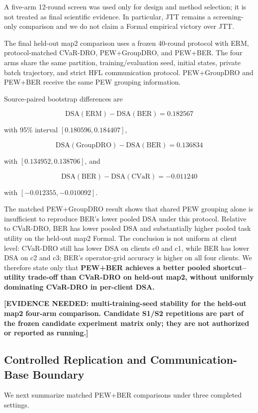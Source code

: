 A five-arm 12-round screen was used only for design and method selection; it is not treated as final scientific evidence. In particular, JTT remains a screening-only comparison and we do not claim a Formal empirical victory over JTT.

The final held-out map2 comparison uses a frozen 40-round protocol with ERM, protocol-matched CVaR-DRO, PEW+GroupDRO, and PEW+BER. The four arms share the same partition, training/evaluation seed, initial states, private batch trajectory, and strict HFL communication protocol. PEW+GroupDRO and PEW+BER receive the same PEW grouping information.



Source-paired bootstrap differences are

\[
\mathrm{DSA(ERM)}-\mathrm{DSA(BER)}=0.182567
\]

with 95\% interval \([0.180596,0.184407]\),

\[
\mathrm{DSA(GroupDRO)}-\mathrm{DSA(BER)}=0.136834
\]

with \([0.134952,0.138706]\), and

\[
\mathrm{DSA(BER)}-\mathrm{DSA(CVaR)}=-0.011240
\]

with \([-0.012355,-0.010092]\).

The matched PEW+GroupDRO result shows that shared PEW grouping alone is insufficient to reproduce BER's lower pooled DSA under this protocol. Relative to CVaR-DRO, BER has lower pooled DSA and substantially higher pooled task utility on the held-out map2 Formal. The conclusion is not uniform at client level: CVaR-DRO still has lower DSA on clients c0 and c1, while BER has lower DSA on c2 and c3; BER's operator-grid accuracy is higher on all four clients. We therefore state only that \textbf{PEW+BER achieves a better pooled shortcut--utility trade-off than CVaR-DRO on held-out map2, without uniformly dominating CVaR-DRO in per-client DSA.}

\textbf{[EVIDENCE NEEDED: multi-training-seed stability for the held-out map2 four-arm comparison. Candidate S1/S2 repetitions are part of the frozen candidate experiment matrix only; they are not authorized or reported as running.]}

\subsection{Controlled Replication and Communication-Base Boundary}

We next summarize matched PEW+BER comparisons under three completed settings.

